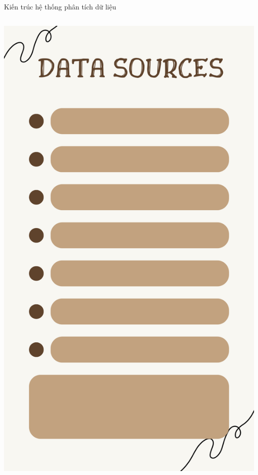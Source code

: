 \documentclass{beamer}
\begin{document}
\begin{frame}{Kiến trúc hệ thống phân tích dữ liệu}

\begin{columns}

\begin{column}{0.24\textwidth}
\includegraphics[width=\textwidth]{pictures/DATA SOURCES.png}
\end{column}


\end{columns}
\end{frame}
\end{document}
